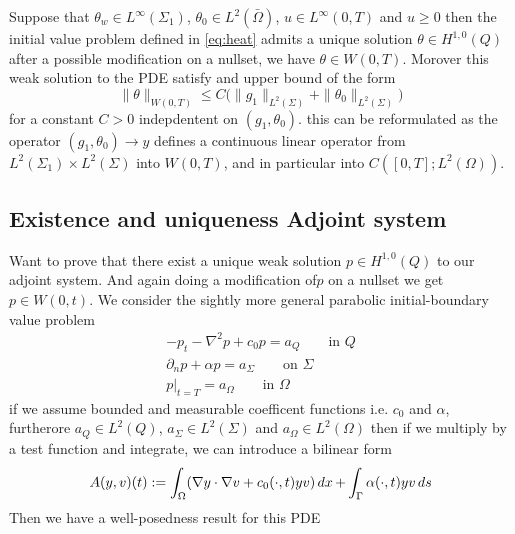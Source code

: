 \begin{corollary}[Existence]
Suppose that $\theta_w \in L^{\infty}(\Sigma_1)$, $\theta_0 \in L^2(\bar{\Omega})$, $u \in L^{\infty}(0,T)$ and $u\geq 0$ then the initial value problem defined in \eqref{eq:heat} admits a unique solution $\theta \in H^{1,0}(Q)$ after a possible modification on a nullset, we have $\theta \in W(0,T)$. Morover this weak solution to the PDE satisfy and upper bound of the form 
\begin{equation*}
    \|\theta \|_{W(0,T)} \leq C\bigg ( \|g_1\|_{L^2(\Sigma)} + \|\theta_0\|_{L^2(\Sigma)} \bigg )
\end{equation*}
for a constant $C>0$ indepdentent on $(g_1, \theta_0)$. this can be reformulated as the operator $(g_1,\theta_0) \rightarrow y$ defines a continuous linear operator from $L^2(\Sigma_1)\times L^2(\Sigma)$ into $W(0,T)$, and in particular into $C([0,T];L^2(\Omega))$.  
\end{corollary}

\subsection{Existence and uniqueness Adjoint system}
Want to prove that there exist a unique weak solution $p \in H^{1,0}(Q)$ to our adjoint system. And again doing a modification of$p$ on a nullset we get $p\in W(0,t)$. We consider the sightly more general parabolic initial-boundary value problem 
\begin{align*}
    -p_t -\nabla^2p +c_0p = a_Q \qquad \text{in } Q \\
    \partial_np + \alpha p = a_{\Sigma} \qquad \text{on } \Sigma \\
    p|_{t=T} = a_{\Omega} \qquad \text{in } \Omega
\end{align*}
if we assume bounded and measurable coefficent functions i.e. $c_0$ and $\alpha$, furtherore $a_Q \in L^2(Q)$, $a_{\Sigma} \in L^2(\Sigma)$ and $a_{\Omega} \in L^2(\Omega)$ then if we multiply by a test function and integrate, we can introduce a bilinear form
\begin{equation}
    \label{eq:parabolic_adj}
    A(y,v)(t) := \int_{\Omega}(\nabla y \cdot \nabla v + c_0(\cdot,t)yv) \mathop{dx} + \int_{\Gamma}\alpha(\cdot,t)yv \mathop{ds}
\end{equation}
Then we have a well-posedness result for this PDE

